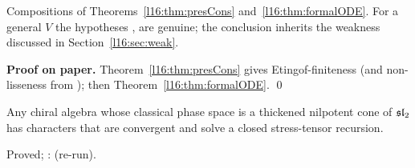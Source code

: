 \begin{dictionary}
Compositions of Theorems~\ref{l16:thm:presCons} and~\ref{l16:thm:formalODE}. For a general $V$ the hypotheses ,
 are genuine; the conclusion inherits the weakness discussed in Section~\ref{l16:sec:weak}.
\end{dictionary}

\textbf{Proof on paper.} Theorem~\ref{l16:thm:presCons} gives Etingof-finiteness (and non-lisseness from ); then
Theorem~\ref{l16:thm:formalODE}. \qed

\begin{physics}
Any chiral algebra whose classical phase space is a thickened nilpotent cone of $\mathfrak{sl}_2$ has characters that are
convergent and solve a closed stress-tensor recursion.
\end{physics}

\begin{status}
Proved; \allowbreak{}\allowbreak{}\allowbreak{}\allowbreak{}: \lean{[propext, Classical.}\allowbreak{}\allowbreak\lean{sound]} (re-run).
\end{status}

